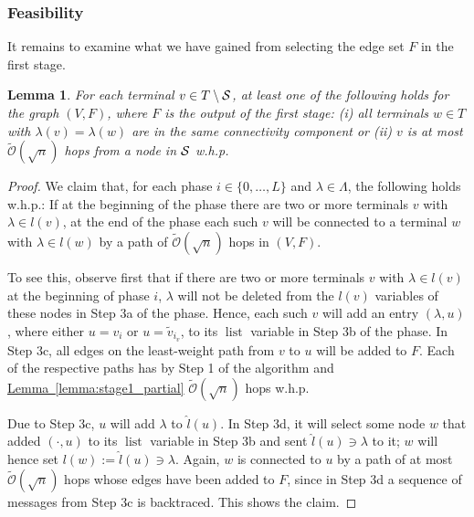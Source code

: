 \documentclass[letterpaper,11pt]{article}
\newtheorem{lemma}[theorem]{Lemma}
\newcommand{\namedref}[2]{\hyperref[#2]{#1~\ref*{#2}}}
\newcommand{\lemmaref}[1]{\namedref{Lemma}{#1}}
\newcommand{\BO}{\mathcal{O}}
\newcommand{\sO}{\tilde{\mathcal{O}}}
\newcommand{\Comp}{\lambda}
\DeclareMathOperator{\unsent}{list}
\begin{document}
\subsubsection*{Feasibility}

It remains to examine what we have gained from selecting the edge set $F$ in
the first stage.

\begin{lemma}\label{lemma:stage1_connect}
For each terminal $v\in T\setminus {\cal S}$, at least one of the
following holds for the graph $(V,F)$, where $F$ is the output of the first
stage: (i) all terminals $w\in T$ with $\Comp(v)=\Comp(w)$ are in the same
connectivity component or (ii) $v$ is at most $\sO(\sqrt{n})$ hops
from a node in ${\cal S}$ w.h.p.
\end{lemma}
\begin{proof}
We claim that, for each phase $i\in \{0,\ldots,L\}$ and $\Comp \in \Lambda$,
the following holds w.h.p.: If at the beginning of the phase there are two or
more terminals $v$ with $\Comp\in l(v)$, at the end of the phase each such $v$
will be connected to a terminal $w$ with $\Comp\in l(w)$ by a path of
$\tilde{\BO}(\sqrt{n})$ hops in $(V,F)$. 

To see this, observe first that if there are two or more terminals $v$ with
$\Comp\in l(v)$ at the beginning of phase $i$, $\Comp$ will not be deleted from
the $l(v)$ variables of these nodes in Step 3a of the phase. Hence, each such
$v$ will add an entry $(\Comp,u)$, where either $u=v_i$ or $u=\tilde{v}_{i_v}$,
to its $\unsent$ variable in Step 3b of the phase. In Step 3c, all edges on the
least-weight path from $v$ to $u$ will be added to $F$. Each of the respective
paths has by Step 1 of the algorithm and \lemmaref{lemma:stage1_partial}
$\tilde{\BO}(\sqrt{n})$ hops w.h.p.

Due to Step 3c, $u$ will add $\Comp$ to $\hat{l}(u)$. In Step 3d, it will select
some node $w$ that added $(\cdot,u)$ to its $\unsent$ variable in Step 3b and
sent $\hat{l}(u)\ni \Comp$ to it; $w$ will hence set $l(w):=\hat{l}(u)\ni
\Comp$. Again, $w$ is connected to $u$ by a path of at most
$\tilde{\BO}(\sqrt{n})$ hops whose edges have been added to $F$, since in Step
3d a sequence of messages from Step 3c is backtraced. This shows the claim.


\end{proof}
\end{document}
